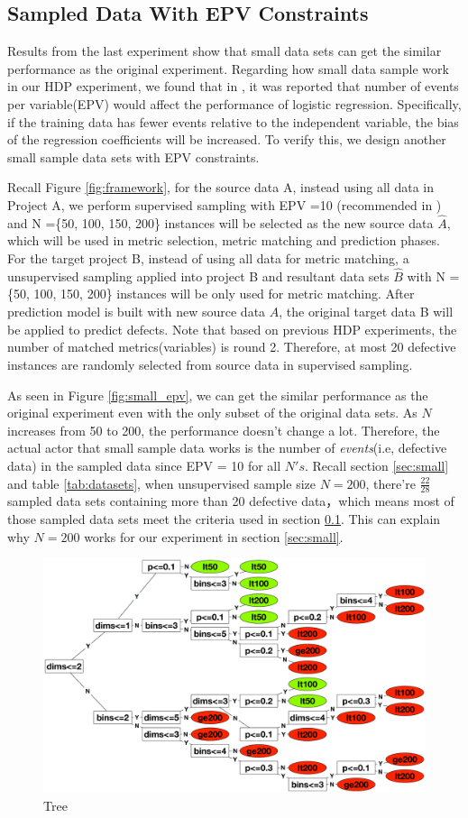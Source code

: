 \subsection{Sampled Data With EPV Constraints}
\label{sec:EPV}
 Results from the last experiment show that small data sets can get the similar performance as the original experiment. Regarding how small data sample work in our HDP experiment,  we found that in \cite{peduzzi1996simulation}, it was reported that number of events per variable(EPV) would affect the performance of logistic regression. Specifically, if the training data has fewer events relative to the independent variable, the bias of the regression coefficients will be increased. To verify this, we design another small sample data sets with EPV constraints.

Recall Figure \ref{fig:framework}, for the source data A, instead using all data in Project A, we perform supervised sampling with EPV =10 (recommended in \cite{peduzzi1996simulation})  and N =\{50, 100, 150, 200\} instances will be selected as the new source data ${\hat A}$, which will be used in metric selection, metric matching and prediction phases. For the target project B, instead of using all data for metric matching, a unsupervised sampling applied into project B and resultant data sets ${\hat B}$ with N = \{50, 100, 150, 200\} instances will be only used for metric matching. After prediction model is built with new source data $\hat A$, the original target data B will be applied to predict defects. Note that based on previous HDP experiments, the number of matched metrics(variables) is round 2. Therefore, at most 20 defective instances are randomly selected from source data in supervised sampling.

As seen in Figure \ref{fig:small_epv}, we can get the similar performance as the original experiment even with the only subset of the original data sets. As $N$ increases from 50 to 200, the performance doesn't change a lot. Therefore, the actual actor that small sample data works is the number of {\it events}(i.e, defective data) in the sampled data since EPV = 10 for all $N's$. Recall section \ref{sec:small} and table \ref{tab:datasets}, when unsupervised sample size $N=200$, there're $\frac{22}{28}$ sampled data sets containing more than 20 defective data，which means most of those sampled data sets meet the criteria used in section \ref{sec:EPV}. This can explain why $N=200$ works for our experiment in section \ref{sec:small}.


\begin{figure}[!htp]
	\centering
	\includegraphics[width=\linewidth]{Figures/raleigh/tree.eps}
	\caption{Tree}
	\label{fig:tree}
\end{figure}


